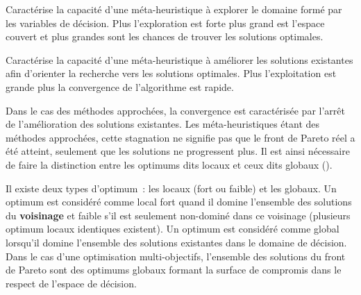 \begin{Def}[Exploration]\label{def:exploration}
Caractérise la capacité d’une méta-heuristique à explorer le domaine formé par les
variables de décision. Plus l’exploration est forte plus grand est l’espace couvert
et plus grandes sont les chances de trouver les solutions optimales.
\end{Def}

\begin{Def}[Exploitation]\label{def:exploitation}
Caractérise la capacité d’une méta-heuristique à améliorer les solutions existantes
afin d’orienter la recherche vers les solutions optimales. Plus l’exploitation est
grande plus la convergence de l’algorithme est rapide.
\end{Def}

\begin{Def}[Convergence]\label{def:convergence}
Dans le cas des méthodes approchées, la convergence est caractérisée par l’arrêt
de l’amélioration des solutions existantes. Les méta-heuristiques étant des
méthodes approchées, cette stagnation ne signifie pas que le front de Pareto réel
a été atteint, seulement que les solutions ne progressent plus. Il est ainsi
nécessaire de faire la distinction entre les optimums dits locaux et ceux dits
globaux ().
\end{Def}

\begin{Def}\label{def:optimum}
Il existe deux types d’optimum~: les locaux (fort ou faible) et les globaux. Un
optimum est considéré comme local fort quand il domine l’ensemble des solutions du
\textbf{voisinage} et faible s’il est seulement non-dominé dans ce voisinage (plusieurs
optimum locaux identiques existent). Un optimum est considéré comme global
lorsqu’il domine l’ensemble des solutions existantes dans le domaine de
décision. Dans le cas d’une optimisation multi-objectifs, l’ensemble des
solutions du front de Pareto sont des optimums globaux formant la surface de
compromis dans le respect de l’espace de décision.
\end{Def}

